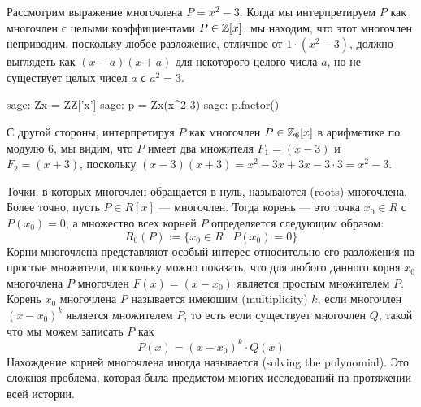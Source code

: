 \begin{example}
\label{example:irreducible_integer_polynomial_1}
 Рассмотрим выражение многочлена $P=x^2-3$. Когда мы интерпретируем $P$ как многочлен с целыми коэффициентами $P\in\mathbb{Z}[x]$, мы находим, что этот многочлен неприводим, поскольку любое разложение, отличное от $1\cdot(x^2-3)$, должно выглядеть как $(x-a)(x+a)$ для некоторого целого числа $a$, но не существует целых чисел $a$ с $a^2=3$.
\begin{sagecommandline}
sage: Zx = ZZ['x']
sage: p = Zx(x^2-3)
sage: p.factor()
\end{sagecommandline}
С другой стороны, интерпретируя $P$ как многочлен $P\in \mathbb{Z}_6[x]$ в арифметике по модулю $6$, мы видим, что $P$ имеет два множителя $F_1=(x-3)$ и $F_2=(x+3)$, поскольку
$(x-3)(x+3)= x^2 -3x +3x -3\cdot 3= x^2-3$.
\end{example}
Точки, в которых многочлен обращается в нуль, называются  (roots) многочлена. Более точно, пусть $P\in R[x]$ — многочлен. Тогда корень — это точка $x_0\in R$ с $P(x_0)=0$, а множество всех корней $P$ определяется следующим образом:
\begin{equation}
R_0(P):=\{x_0\in R\;|\; P(x_0)=0\}
\end{equation}
Корни многочлена представляют особый интерес относительно его разложения на простые множители, поскольку можно показать, что для любого данного корня $x_0$ многочлена $P$ многочлен $F(x)=(x-x_0)$ является простым множителем $P$. Корень $x_0$ многочлена $P$ называется имеющим  (multiplicity) $k$, если многочлен $(x-x_0)^k$ является множителем $P$, то есть если существует многочлен $Q$, такой что мы можем записать $P$ как
\begin{equation}
P(x)= (x-x_0)^k \cdot Q(x)
\end{equation}
Нахождение корней многочлена иногда называется  (solving the polynomial). Это сложная проблема, которая была предметом многих исследований на протяжении всей истории.

